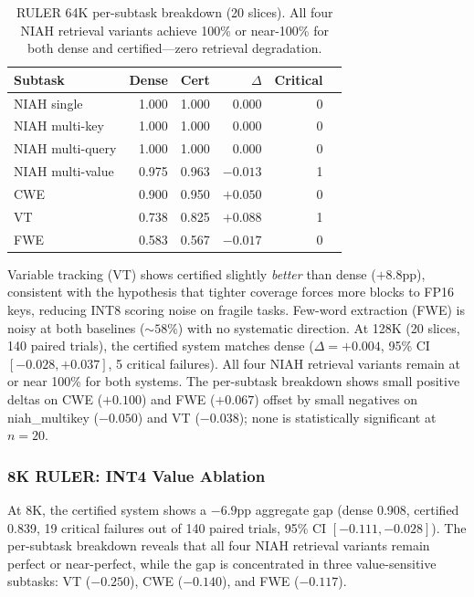 \documentclass[10pt,twocolumn,a4paper]{article}
\theoremstyle{definition}
\theoremstyle{remark}
\begin{document}
\begin{table}[!t]
\centering
\caption{RULER 64K per-subtask breakdown (20 slices).  All four NIAH retrieval variants achieve 100\% or near-100\% for both dense and certified---zero retrieval degradation.}
\label{tab:ruler_subtask}
\small
\begin{tabular}{lrrrrr}
\toprule
\textbf{Subtask} & \textbf{Dense} & \textbf{Cert} & \textbf{$\Delta$} & \textbf{Critical} \\
\midrule
NIAH single      & 1.000 & 1.000 & $0.000$  & 0 \\
NIAH multi-key   & 1.000 & 1.000 & $0.000$  & 0 \\
NIAH multi-query & 1.000 & 1.000 & $0.000$  & 0 \\
NIAH multi-value & 0.975 & 0.963 & $-0.013$ & 1 \\
CWE              & 0.900 & 0.950 & $+0.050$ & 0 \\
VT               & 0.738 & 0.825 & $+0.088$ & 1 \\
FWE              & 0.583 & 0.567 & $-0.017$ & 0 \\
\bottomrule
\end{tabular}
\end{table}

Variable tracking (VT) shows certified slightly \emph{better} than dense ($+8.8$pp), consistent with the hypothesis that tighter coverage forces more blocks to FP16 keys, reducing INT8 scoring noise on fragile tasks.  Few-word extraction (FWE) is noisy at both baselines (${\sim}58\%$) with no systematic direction.  At 128K (20 slices, 140 paired trials), the certified system matches dense ($\Delta{=}{+}0.004$, 95\% CI $[-0.028, {+}0.037]$, 5 critical failures).  All four NIAH retrieval variants remain at or near 100\% for both systems.  The per-subtask breakdown shows small positive deltas on CWE ($+0.100$) and FWE ($+0.067$) offset by small negatives on niah\_multikey ($-0.050$) and VT ($-0.038$); none is statistically significant at $n{=}20$.

\subsubsection{8K RULER: INT4 Value Ablation}
\label{sec:ruler_8k_ablation}

At 8K, the certified system shows a $-6.9$pp aggregate gap (dense 0.908, certified 0.839, 19 critical failures out of 140 paired trials, 95\% CI $[-0.111, -0.028]$).  The per-subtask breakdown reveals that all four NIAH retrieval variants remain perfect or near-perfect, while the gap is concentrated in three value-sensitive subtasks: VT ($-0.250$), CWE ($-0.140$), and FWE ($-0.117$).
\end{document}
